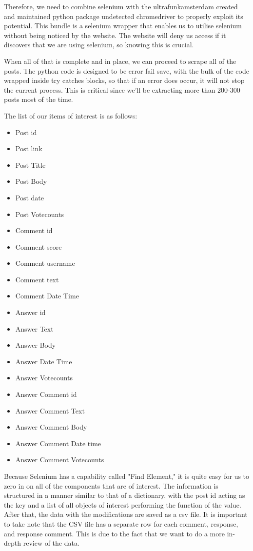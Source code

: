 Therefore, we need to combine selenium with the ultrafunkamsterdam created and maintained python package undetected chromedriver to properly exploit its potential. This bundle is a selenium wrapper that enables us to utilise selenium without being noticed by the website. The website will deny us access if it discovers that we are using selenium, so knowing this is crucial.

When all of that is complete and in place, we can proceed to scrape all of the posts. The python code is designed to be error fail save, with the bulk of the code wrapped inside try catches blocks, so that if an error does occur, it will not stop the current process. This is critical since we'll be extracting more than 200-300 posts most of the time.

The list of our items of interest is as follows:
\begin{itemize}
    \item Post id
    \item Post link
    \item Post Title
    \item Post Body
    \item Post date
    \item Post Votecounts
    \item Comment id
    \item Comment score
    \item Comment username
    \item Comment text
    \item Comment Date Time
    \item Answer id
    \item Answer Text
    \item Answer Body
    \item Answer Date Time
    \item Answer Votecounts
    \item Answer Comment id
    \item Answer Comment Text
    \item Answer Comment Body
    \item Answer Comment Date time
    \item Answer Comment Votecounts
\end{itemize}

Because Selenium has a capability called "Find Element," it is quite easy for us to zero in on all of the components that are of interest. The information is structured in a manner similar to that of a dictionary, with the post id acting as the key and a list of all objects of interest performing the function of the value. After that, the data with the modifications are saved as a csv file. It is important to take note that the CSV file has a separate row for each comment, response, and response comment. This is due to the fact that we want to do a more in-depth review of the data.

